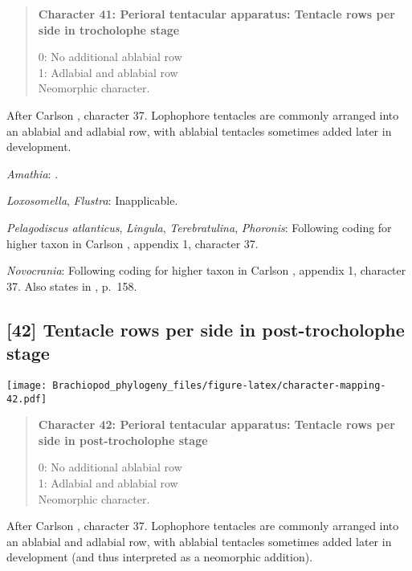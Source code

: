 \documentclass[openany]{book}
\theoremstyle{definition}
\theoremstyle{definition}
\theoremstyle{definition}
\theoremstyle{remark}
\begin{document}
\begin{quote}
\textbf{Character 41: Perioral tentacular apparatus: Tentacle rows per
side in trocholophe stage}

0: No additional ablabial row\\
1: Adlabial and ablabial row\\
Neomorphic character.
\end{quote}

After Carlson \citeyearpar{Carlson1995Phylogeneticrelationships},
character 37. Lophophore tentacles are commonly arranged into an
ablabial and adlabial row, with ablabial tentacles sometimes added later
in development.

\hypertarget{Amathia-coding-41}{}
\emph{Amathia}: \citep{Temereva2016Thenervous}.

\hypertarget{Flustra-coding-41}{}
\emph{Loxosomella}, \emph{Flustra}: Inapplicable.

\hypertarget{Lingula-coding-41}{}
\emph{Pelagodiscus atlanticus}, \emph{Lingula}, \emph{Terebratulina},
\emph{Phoronis}: Following coding for higher taxon in Carlson
\citeyearpar{Carlson1995Phylogeneticrelationships}, appendix 1,
character 37.

\hypertarget{Novocrania-coding-41}{}
\emph{Novocrania}: Following coding for higher taxon in Carlson
\citeyearpar{Carlson1995Phylogeneticrelationships}, appendix 1,
character 37. Also states in
\citet{Williams2000LinguliformeaCraniiformea}, p.~158.

\subsection*{{[}42{]} Tentacle rows per side in post-trocholophe
stage}\label{tentacle-rows-per-side-in-post-trocholophe-stage}

\texttt{[image: Brachiopod\_phylogeny\_files/figure-latex/character-mapping-42.pdf]}

\begin{quote}
\textbf{Character 42: Perioral tentacular apparatus: Tentacle rows per
side in post-trocholophe stage}

0: No additional ablabial row\\
1: Adlabial and ablabial row\\
Neomorphic character.
\end{quote}

After Carlson \citeyearpar{Carlson1995Phylogeneticrelationships},
character 37. Lophophore tentacles are commonly arranged into an
ablabial and adlabial row, with ablabial tentacles sometimes added later
in development (and thus interpreted as a neomorphic addition).
\end{document}
